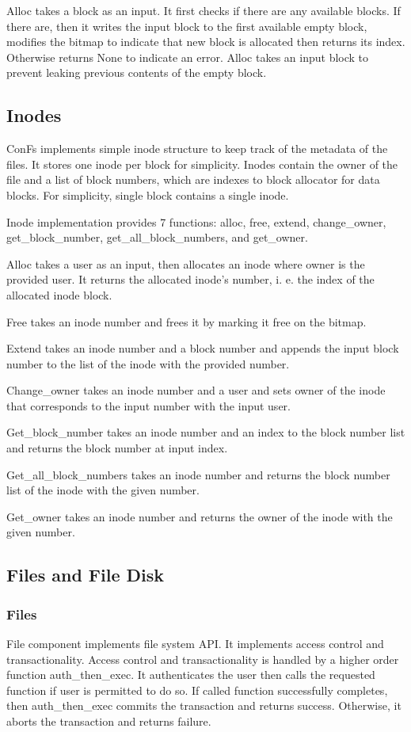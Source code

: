 Alloc takes a block as an input. It first checks if there are any available blocks. If there are, then it writes the input block to the first available empty block, modifies the bitmap to indicate that new block is allocated then returns its index. Otherwise returns None to indicate an error. Alloc takes an input block to prevent leaking previous contents of the empty block.

\subsection{Inodes}
ConFs implements simple inode structure to keep track of the metadata of the files. It stores one inode per block for simplicity. Inodes contain the owner of the file and a list of block numbers, which are indexes to block allocator for data blocks. For simplicity, single block contains a single inode. 

Inode implementation provides 7 functions: alloc, free, extend, change\_owner, get\_block\_number, get\_all\_block\_numbers, and get\_owner.

Alloc takes a user as an input, then allocates an inode where owner is the provided user. It returns the allocated inode's number, i. e. the index of the allocated inode block. 

Free takes an inode number and frees it by marking it free on the bitmap.

Extend takes an inode number and a block number and appends the input block number to the list of the inode with the provided number.

Change\_owner takes an inode number and a user and sets owner of the inode that corresponds to the input number with the input user.

Get\_block\_number takes an inode number and an index to the block number list and returns the block number at input index.

Get\_all\_block\_numbers  takes an inode number and returns the block number list of the inode with the given number.

Get\_owner  takes an inode number and returns the owner of the inode with the given number.

\subsection{Files and File Disk}
\subsubsection{Files}
File component implements file system API. It implements access control and transactionality. Access control and transactionality is handled by a higher order function auth\_then\_exec. It authenticates the user then calls the requested function if user is permitted to do so. If called function successfully completes, then auth\_then\_exec commits the transaction and returns success. Otherwise, it aborts the transaction and returns failure.

